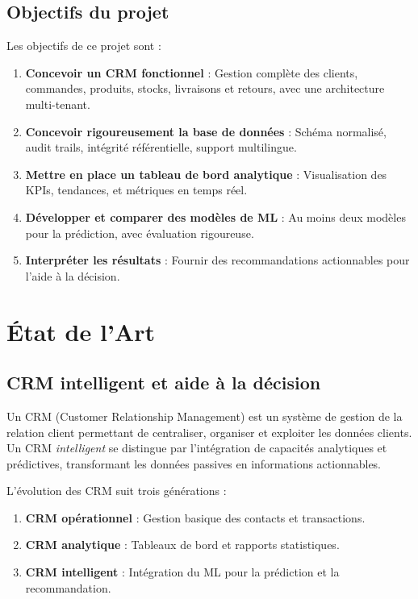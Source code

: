 \documentclass[12pt,a4paper]{report}
\begin{document}
\section{Objectifs du projet}

Les objectifs de ce projet sont :

\begin{enumerate}
  \item \textbf{Concevoir un CRM fonctionnel} : Gestion compl\`{e}te des clients, commandes, produits, stocks, livraisons et retours, avec une architecture multi-tenant.
  \item \textbf{Concevoir rigoureusement la base de donn\'{e}es} : Sch\'{e}ma normalis\'{e}, audit trails, int\'{e}grit\'{e} r\'{e}f\'{e}rentielle, support multilingue.
  \item \textbf{Mettre en place un tableau de bord analytique} : Visualisation des KPIs, tendances, et m\'{e}triques en temps r\'{e}el.
  \item \textbf{D\'{e}velopper et comparer des mod\`{e}les de ML} : Au moins deux mod\`{e}les pour la pr\'{e}diction, avec \'{e}valuation rigoureuse.
  \item \textbf{Interpr\'{e}ter les r\'{e}sultats} : Fournir des recommandations actionnables pour l'aide \`{a} la d\'{e}cision.
\end{enumerate}


\chapter{\'{E}tat de l'Art}

\section{CRM intelligent et aide \`{a} la d\'{e}cision}

Un CRM (Customer Relationship Management) est un syst\`{e}me de gestion de la relation client permettant de centraliser, organiser et exploiter les donn\'{e}es clients. Un CRM \textit{intelligent} se distingue par l'int\'{e}gration de capacit\'{e}s analytiques et pr\'{e}dictives, transformant les donn\'{e}es passives en informations actionnables.

L'\'{e}volution des CRM suit trois g\'{e}n\'{e}rations :
\begin{enumerate}
  \item \textbf{CRM op\'{e}rationnel} : Gestion basique des contacts et transactions.
  \item \textbf{CRM analytique} : Tableaux de bord et rapports statistiques.
  \item \textbf{CRM intelligent} : Int\'{e}gration du ML pour la pr\'{e}diction et la recommandation.
\end{enumerate}
\end{document}
